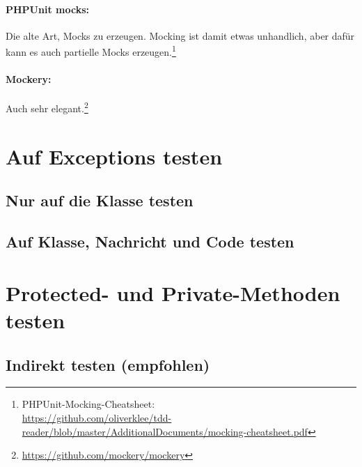 \documentclass[a4paper,10pt,headsepline]{scrartcl}
\begin{document}
\paragraph{PHPUnit mocks:} Die alte Art, Mocks zu erzeugen. Mocking ist damit etwas unhandlich, aber dafür kann es auch partielle Mocks erzeugen.\footnote{PHPUnit-Mocking-Cheatsheet:\\ \url{https://github.com/oliverklee/tdd-reader/blob/master/AdditionalDocuments/mocking-cheatsheet.pdf}}
\paragraph{Mockery:} Auch sehr elegant.\footnote{\url{https://github.com/mockery/mockery}}



\pagebreak
\section{Auf Exceptions testen}

\subsection{Nur auf die Klasse testen}

\subsection{Auf Klasse, Nachricht und Code testen}


\section{Protected- und Private-Methoden testen}

\subsection{Indirekt testen (empfohlen)}
\end{document}
